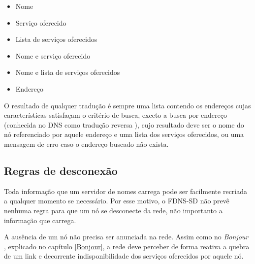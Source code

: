    \begin{itemize}
        \item Nome
        \item Serviço oferecido
        \item Lista de serviços oferecidos
        \item Nome e serviço oferecido
        \item Nome e lista de serviços oferecidos
        \item Endereço
    \end{itemize}
    
    O resultado de qualquer tradução é sempre uma lista contendo os endereços
    cujas características satisfaçam o critério de busca, exceto a busca por endereço
    (conhecida no DNS como tradução reversa \cite{rfc1035}), cujo resultado deve
    ser o nome do nó referenciado por aquele endereço e uma lista dos serviços
    oferecidos, ou uma mensagem de erro caso o endereço buscado não exista.
    
\subsection{Regras de desconexão}
    Toda informação que um servidor de nomes carrega pode ser facilmente recriada
    a qualquer momento se necessário. Por esse motivo, o FDNS-SD não prevê nenhuma
    regra para que um nó se desconecte da rede, não importanto a informação que
    carrega.
    
    A ausência de um nó não precisa ser anunciada na rede. Assim como no
    \textit{Bonjour} \cite{mdns}, explicado no capítulo \ref{Bonjour}, a rede
    deve perceber de forma reativa a quebra de um link e decorrente indisponibilidade
    dos serviços oferecidos por aquele nó.